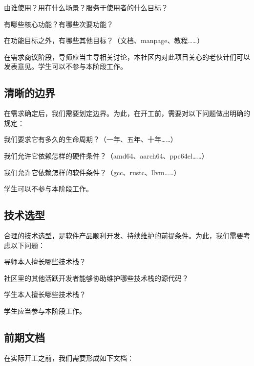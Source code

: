 \documentclass[a4paper,11pt]{article}
\newcommand{\smallnote}[1]{{\sffamily\footnotesize#1}}
\begin{document}
\begin{compactitem}
	\item 由谁使用？用在什么场景？服务于使用者的什么目标？
	\item 有哪些核心功能？有哪些次要功能？
	\item 在功能目标之外，有哪些其他目标？\smallnote{（文档、manpage、教程……）}
\end{compactitem}

在需求商议阶段，导师应当主导相关讨论，本社区内对此项目关心的老伙计们可以发表意见。学生可以不参与本阶段工作。

\subsection{清晰的边界}

在需求确定后，我们需要划定边界。为此，在开工前，需要对以下问题做出明确的规定：

\begin{compactitem}
	\item 我们要求它有多久的生命周期？\smallnote{（一年、五年、十年……）}
	\item 我们允许它依赖怎样的硬件条件？\smallnote{（amd64、aarch64、ppc64el……）}
	\item 我们允许它依赖怎样的软件条件？\smallnote{（gcc、rustc、llvm……）}
\end{compactitem}

学生可以不参与本阶段工作。

\subsection{技术选型}

合理的技术选型，是软件产品顺利开发、持续维护的前提条件。为此，我们需要考虑以下问题：

\begin{compactitem}
	\item 导师本人擅长哪些技术栈？
	\item 社区里的其他活跃开发者能够协助维护哪些技术栈的源代码？
	\item 学生本人擅长哪些技术栈？
\end{compactitem}

学生应当参与本阶段工作。

\subsection{前期文档}

在实际开工之前，我们需要形成如下文档：
\end{document}
